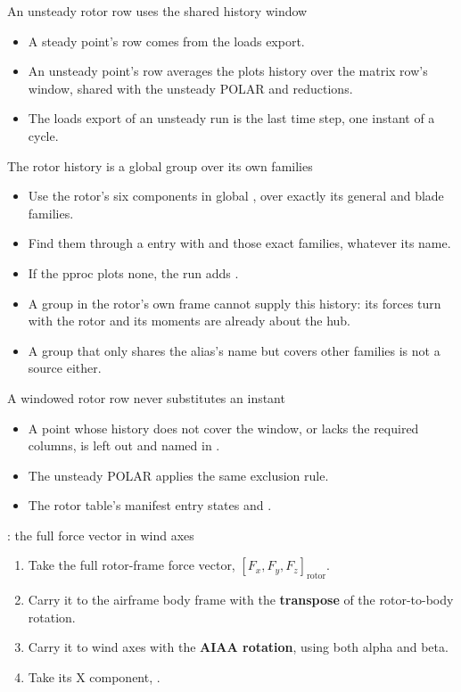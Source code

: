 \begin{frame}{An unsteady rotor row uses the shared history window}
\begin{itemize}
  \item A steady point's row comes from the loads export.
  \item An unsteady point's row averages the plots history over the
        matrix row's window, shared with the unsteady POLAR and reductions.
  \item The loads export of an unsteady run is the last time step,
        one instant of a cycle.
\end{itemize}
\end{frame}

\begin{frame}{The rotor history is a global group over its own families}
\begin{itemize}\small
  \item Use the rotor's six components 
        in global , over exactly its general and blade families.
  \item Find them through a  entry with
         and those exact families, whatever its name.
  \item If the pproc plots none, the run adds .
  \item A group in the rotor's own frame cannot supply this history:
        its forces turn with the rotor and its moments are already about the hub.
  \item A group that only shares the alias's name but covers other families
        is not a source either.
\end{itemize}
\end{frame}

\begin{frame}{A windowed rotor row never substitutes an instant}
\begin{itemize}\small
  \item A point whose history does not cover the window, or lacks the required
        columns, is left out and named in .
  \item The unsteady POLAR applies the same exclusion rule.
  \item The rotor table's manifest entry states  and .
\end{itemize}
\end{frame}

\begin{frame}{: the full force vector in wind axes}
\begin{enumerate}
  \item Take the full rotor-frame force vector, $[F_x,F_y,F_z]_{\mathrm{rotor}}$.
  \item Carry it to the airframe body frame with the \textbf{transpose}
        of the rotor-to-body rotation.
  \item Carry it to wind axes with the \textbf{AIAA rotation}, using
        both alpha and beta.
  \item Take its X component, .
\end{enumerate}
\end{frame}

